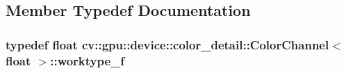\subsection{Member Typedef Documentation}
\hypertarget{structcv_1_1gpu_1_1device_1_1color__detail_1_1ColorChannel_3_01float_01_4_ab5166955a676285adf53eeb416c194fa}{
\subsubsection[{worktype\-\_\-f}]{\setlength{\rightskip}{0pt plus 5cm}typedef float {\bf cv\-::gpu\-::device\-::color\-\_\-detail\-::\-Color\-Channel}$<$ float $>$\-::{\bf worktype\-\_\-f}}}\label{structcv_1_1gpu_1_1device_1_1color__detail_1_1ColorChannel_3_01float_01_4_ab5166955a676285adf53eeb416c194fa}


